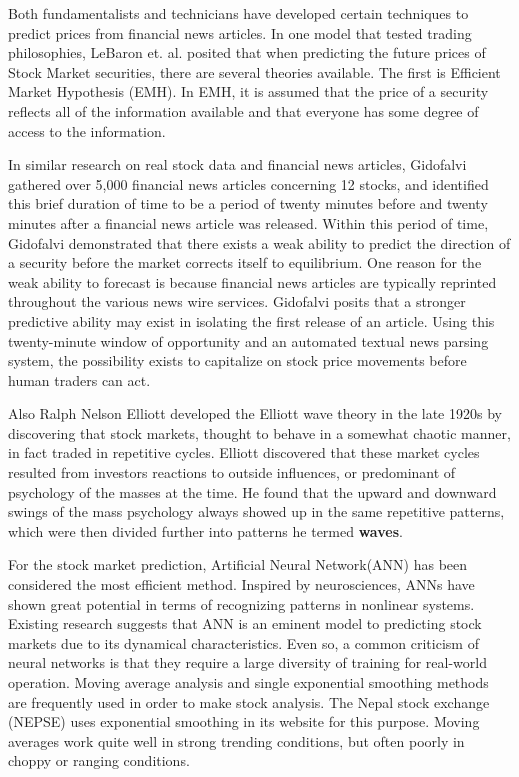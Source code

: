 Both fundamentalists and technicians have developed certain techniques to predict prices from financial news articles. In one model that tested trading philosophies, LeBaron et. al. posited that when predicting the future prices of Stock Market securities, there are several theories available. The first is Efficient Market Hypothesis (EMH). In EMH, it is assumed that the price of a security reflects all of the information available and that everyone has some degree of access to the information.

In similar research on real stock data and financial news articles, Gidofalvi gathered over 5,000 financial news articles concerning 12 stocks, and identified this brief duration of time to be a period of twenty minutes before and twenty minutes after a financial news article was released. Within this period of time, Gidofalvi demonstrated that there exists a weak ability to predict the direction of a security before the market corrects itself to equilibrium. One reason for the weak ability to forecast is because financial news articles are typically reprinted throughout the various news wire services. Gidofalvi posits that a stronger predictive ability may exist in isolating the first release of an article. Using this twenty-minute window of opportunity and an automated textual news parsing system, the possibility exists to capitalize on stock price movements before human traders can act. 

Also Ralph Nelson Elliott developed the Elliott wave theory in the late 1920s by discovering that stock markets, thought to behave in a somewhat chaotic manner, in fact traded in repetitive cycles. Elliott discovered that these market cycles resulted from investors reactions to outside influences, or predominant of psychology of the masses at the time. He found that the upward and downward swings of the mass psychology always showed up in the same repetitive patterns, which were then divided further into patterns he termed \textbf{waves}.

For the stock market prediction, Artificial Neural Network(ANN) has been considered the most efficient method. Inspired by neurosciences, ANNs have shown great potential in terms of recognizing patterns in nonlinear systems. Existing research suggests that ANN is an eminent model to predicting stock markets due to its dynamical characteristics. Even so, a common criticism of neural networks is that they require a large diversity of training for real-world operation. Moving average analysis and single exponential smoothing methods are frequently used in order to make stock analysis. The Nepal stock exchange (NEPSE) uses exponential smoothing in its website for this purpose. Moving averages work quite well in strong trending conditions, but often poorly in choppy or ranging conditions.

